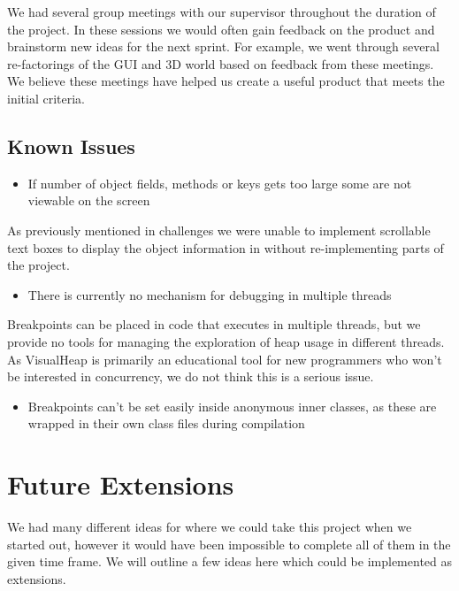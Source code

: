 \documentclass[11pt, a4paper]{report}
\begin{document}
We had several group meetings with our supervisor throughout the duration of the project. In these sessions we would often gain feedback on the product and brainstorm new ideas for the next sprint. For example, we went through several re-factorings of the GUI and 3D world based on feedback from these meetings. We believe these meetings have helped us create a useful product that meets the initial criteria.

\section{Known Issues}

\begin{itemize}
  \item If number of object fields, methods or keys gets too large some are not viewable on the screen
\end{itemize}

As previously mentioned in challenges we were unable to implement scrollable text boxes to display the object information in without re-implementing parts of the project.

\begin{itemize}
  \item There is currently no mechanism for debugging in multiple threads
\end{itemize}

Breakpoints can be placed in code that executes in multiple threads, but we provide no tools for managing the exploration of heap usage in different threads.  As VisualHeap is primarily an educational tool for new programmers who won’t be interested in concurrency, we do not think this is a serious issue.

\begin{itemize}
  \item Breakpoints can’t be set easily inside anonymous inner classes, as these are wrapped in their own class files during compilation
\end{itemize}

\chapter{Future Extensions}

We had many different ideas for where we could take this project when we started out, however it would have been impossible to complete all of them in the given time frame. We will outline a few ideas here which could be implemented as extensions.
\end{document}
